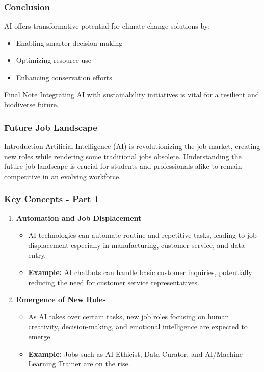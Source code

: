 \documentclass[aspectratio=169]{beamer}
\begin{document}
\begin{frame}[fragile]
    \frametitle{Conclusion}
    AI offers transformative potential for climate change solutions by:
    \begin{itemize}
        \item Enabling smarter decision-making
        \item Optimizing resource use
        \item Enhancing conservation efforts
    \end{itemize}
    \begin{block}{Final Note}
        Integrating AI with sustainability initiatives is vital for a resilient and biodiverse future.
    \end{block}
\end{frame}

\begin{frame}[fragile]
    \frametitle{Future Job Landscape}
    \begin{block}{Introduction}
        Artificial Intelligence (AI) is revolutionizing the job market, creating new roles while rendering some traditional jobs obsolete. Understanding the future job landscape is crucial for students and professionals alike to remain competitive in an evolving workforce.
    \end{block}
\end{frame}

\begin{frame}[fragile]
    \frametitle{Key Concepts - Part 1}
    \begin{enumerate}
        \item \textbf{Automation and Job Displacement}
            \begin{itemize}
                \item AI technologies can automate routine and repetitive tasks, leading to job displacement especially in manufacturing, customer service, and data entry.
                \item \textbf{Example:} AI chatbots can handle basic customer inquiries, potentially reducing the need for customer service representatives.
            \end{itemize}

        \item \textbf{Emergence of New Roles}
            \begin{itemize}
                \item As AI takes over certain tasks, new job roles focusing on human creativity, decision-making, and emotional intelligence are expected to emerge.
                \item \textbf{Example:} Jobs such as AI Ethicist, Data Curator, and AI/Machine Learning Trainer are on the rise.
            \end{itemize}
    \end{enumerate}
\end{frame}
\end{document}
